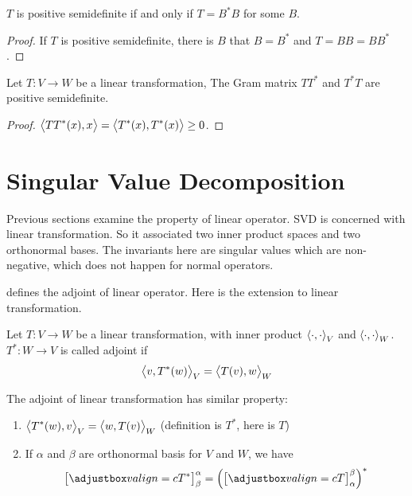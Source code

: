 \begin{theorem}
    $T$ is positive semidefinite if and only if $T = B^*B$ for some $B$.    
\end{theorem}
\begin{proof}
    If $T$ is positive semidefinite, there is $B$ that $B = B^*$ and $T = BB = BB^*$.
\end{proof}


\begin{theorem}\label{tt_positive_semidefinite}
    Let $T:V \rightarrow W$ be a linear transformation, The Gram matrix $TT^*$ and $T^*T$ are positive semidefinite.
\end{theorem}
\begin{proof}
    $\left\langle \displaystyle TT^*(x), x \right\rangle = \left\langle \displaystyle T^*(x), T^*(x) \right\rangle \geq 0$.
\end{proof}



\section{Singular Value Decomposition}

Previous sections examine the property of linear operator. SVD is concerned with linear transformation. So it associated two inner product spaces and two orthonormal bases. The invariants here are singular values which are non-negative, which does not happen for normal operators.

\begin{definition}
     defines the adjoint of linear operator. Here is the extension to linear transformation.
    
    Let $T:V \rightarrow W$ be a linear transformation, with inner product $\left\langle \displaystyle \cdot, \cdot \right\rangle_V$ and $\left\langle \displaystyle \cdot, \cdot \right\rangle_W$. $T^*: W \rightarrow V$ is called adjoint if 
    \begin{equation}
        \left\langle \displaystyle v, T^*(w) \right\rangle_V = \left\langle \displaystyle T(v), w \right\rangle_W
    \end{equation}
\end{definition}

\begin{theorem}
    The adjoint of linear transformation has similar property:
\begin{enumerate}
    \item $\left\langle \displaystyle T^*(w), v \right\rangle_V = \left\langle \displaystyle w, T(v) \right\rangle_W$ (definition is $T^*$, here is $T$)
    \item If $\alpha$ and $\beta$ are orthonormal basis for $V$ and $W$, we have \begin{equation}
        \coordinate{T^*}_\beta^\alpha = \left(\coordinate{T}_\alpha^\beta\right)^*
    \end{equation}
\end{enumerate}
\end{theorem}



